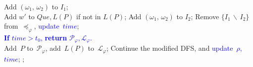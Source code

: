 \begin{algorithm}[h]
{{{{{						Add $(\omega_{1},\,\omega_{2})$ to $I_1$;\\
						Add $w'$ to $Que, L(P)$ if not in $L(P)$;\label{alg1:add-w}
					}{Add $(\omega_{1},\,\omega_{2})$ to $I_2$;\label{alg1:end_que}}
				}
				Remove $\{I_1\,\backslash\, I_2\}$
				from~$\preceq_{\varphi} $, \textcolor{blue}{update~$time$};\label{alg-line:remove}\\
				\textcolor{blue}{\textbf{If} $time>t_0$, \textbf{return}  $\mathcal{P}_{\varphi},\mathcal{L}_{\varphi}$.}\\}
			Add~$P$ to~$\mathcal{P}_{\varphi}$,
			add~$L(P)$ to~$\mathcal{L}_{\varphi}$;}
		Continue the modified DFS, and \textcolor{blue}{update~$\rho$, $time$};
	}
	;
\end{algorithm}




